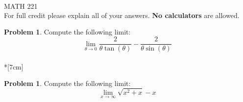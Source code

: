 \documentclass[11pt]{article}  %
\theoremstyle{definition}
\newtheorem{Prob}[Thm]{Problem}
\theoremstyle{remark}
\begin{document}
 \quad\qquad\qquad\qquad\qquad\qquad\qquad\qquad\qquad\qquad\qquad\qquad\qquad\qquad\qquad\qquad\qquad{}\\[.2cm]
{\large MATH 221}\newline \newline
{}
\newline
\thispagestyle{empty}  
\pagestyle{plain}
\setcounter{page}{1}
\\
For full credit please explain all of your answers.  {\bf No calculators} are allowed.\\

\begin{Prob}
Compute the following limit:
\[
\lim_{\theta \to 0} \frac{2}{\theta \tan(\theta)} - \frac{2}{\theta \sin(\theta)}
\]
\\*[7cm]
\end{Prob}

\begin{Prob}
Compute the following limit:
\[
\lim_{x \to \infty} \sqrt{x^2+x} - x
\]
\end{Prob}
\end{document}
